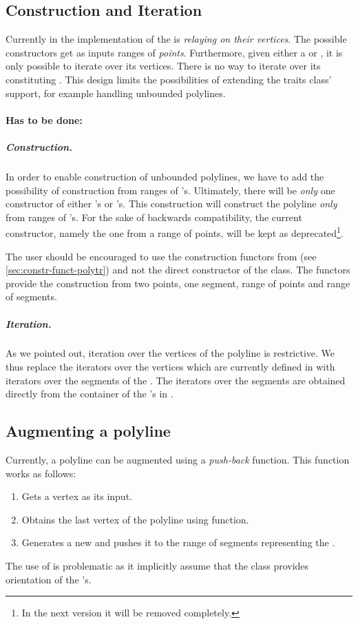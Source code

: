 \documentclass[a4paper,10pt]{article}
\begin{document}
\subsection{Construction and Iteration}
\label{sec:constr+iter-poly}

Currently in  the implementation of the  is \emph{relaying on their vertices}.
The possible constructors get as inputs ranges of \emph{points}.
Furthermore, given either a \poly or \xpoly, it is only possible to iterate over its vertices.
There is no way to iterate over its constituting .
This design limits the possibilities of extending the traits class' support, for example handling unbounded polylines.

\paragraph{Has to be done:}
\subparagraph{Construction.}
In order to enable construction of unbounded polylines, we have to add the possibility of construction from ranges of \seg's.
Ultimately, there will be \emph{only} one constructor of either \poly's or \xpoly's.
This construction will construct the polyline \emph{only} from ranges of \seg's.
For the sake of backwards compatibility, the current constructor, namely the one from a range of points, will be kept as deprecated\footnote{In the next version it will be removed completely.}.

The user should be encouraged to use the construction functors from \polytr (see \cref{sec:constr-funct-polytr}) and not the direct constructor of the class.
The functors provide the construction from two points, one segment, range of points and range of segments.

\subparagraph{Iteration.}
As we pointed out, iteration over the vertices of the polyline is restrictive.
We thus replace the iterators over the vertices which are currently defined in \poly with iterators over the segments of the \poly.
The iterators over the segments are obtained directly from the container of the \seg's in \poly.

\subsection{Augmenting a polyline}
\label{sec:augmenting-poly}

Currently, a polyline can be augmented using a \emph{push-back} function.
This function works as follows:
\begin{enumerate}
\item Gets a vertex as its input.
\item Obtains the last vertex of the polyline using  function.
\item Generates a new \seg and pushes it to the range of segments representing the \poly.
\end{enumerate}
The use of  is problematic as it implicitly assume that the \segtr class provides orientation of the \seg's.
\end{document}
